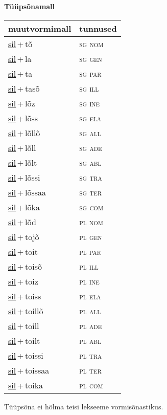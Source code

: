
\vspace{1.8em}
\begin{minipage}{\textwidth}
\textbf{Tüüpsõnamall \,}\\

\begin{sideways}
\begin{tabular}{l l}
muutvormimall & tunnused \\
\hline
\underline{sil}\,+\,tõ & \textsc{ sg nom } \\
\underline{sil}\,+\,la & \textsc{ sg gen } \\
\underline{sil}\,+\,ta & \textsc{ sg par } \\
\underline{sil}\,+\,tasõ & \textsc{ sg ill } \\
\underline{sil}\,+\,lõz & \textsc{ sg ine } \\
\underline{sil}\,+\,lõss & \textsc{ sg ela } \\
\underline{sil}\,+\,lõllõ & \textsc{ sg all } \\
\underline{sil}\,+\,lõll & \textsc{ sg ade } \\
\underline{sil}\,+\,lõlt & \textsc{ sg abl } \\
\underline{sil}\,+\,lõssi & \textsc{ sg tra } \\
\underline{sil}\,+\,lõssaa & \textsc{ sg ter } \\
\underline{sil}\,+\,lõka & \textsc{ sg com } \\
\underline{sil}\,+\,lõd & \textsc{ pl nom } \\
\underline{sil}\,+\,tojõ & \textsc{ pl gen } \\
\underline{sil}\,+\,toit & \textsc{ pl par } \\
\underline{sil}\,+\,toisõ & \textsc{ pl ill } \\
\underline{sil}\,+\,toiz & \textsc{ pl ine } \\
\underline{sil}\,+\,toiss & \textsc{ pl ela } \\
\underline{sil}\,+\,toillõ & \textsc{ pl all } \\
\underline{sil}\,+\,toill & \textsc{ pl ade } \\
\underline{sil}\,+\,toilt & \textsc{ pl abl } \\
\underline{sil}\,+\,toissi & \textsc{ pl tra } \\
\underline{sil}\,+\,toissaa & \textsc{ pl ter } \\
\underline{sil}\,+\,toika & \textsc{ pl com } \\
\end{tabular}
\end{sideways}
\label{tab:tüüpsõnamall-siltõ}

\end{minipage}

 
\vspace{1em}
\noindent Tüüpsõna ei hõlma teisi lekseeme vormi\-sõnastikus.
